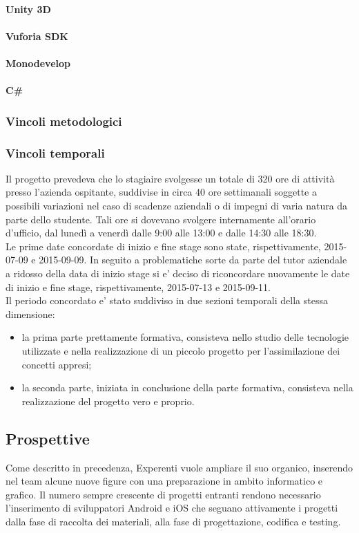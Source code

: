 \paragraph{Unity 3D}

\paragraph{Vuforia SDK}

\paragraph{Monodevelop}

\paragraph{C\#}

\subsubsection{Vincoli metodologici}

\subsubsection{Vincoli temporali}
Il progetto prevedeva che lo stagiaire svolgesse un totale di 320 ore di attività presso l’azienda ospitante, suddivise in circa 40 ore settimanali soggette a possibili variazioni nel caso di scadenze aziendali o di impegni di varia natura da parte dello studente. Tali ore si dovevano svolgere internamente all’orario d’ufficio, dal lunedì a venerdì dalle 9:00 alle 13:00 e dalle 14:30 alle 18:30.
\\
Le prime date concordate di inizio e fine stage sono state, rispettivamente, 2015-07-09 e 2015-09-09. In seguito a problematiche sorte da parte del tutor aziendale a ridosso della data di inizio stage si e' deciso di riconcordare nuovamente le date di inizio e fine stage, rispettivamente, 2015-07-13 e 2015-09-11. 
\\
Il periodo concordato e' stato suddiviso in due sezioni temporali della stessa dimensione:
\begin{itemize}
	\item la prima parte prettamente formativa, consisteva nello studio delle tecnologie utilizzate e nella realizzazione di un piccolo progetto per l'assimilazione dei concetti appresi;
	\item la seconda parte, iniziata in conclusione della parte formativa, consisteva nella realizzazione del progetto vero e proprio.
\end{itemize}

\subsection{Prospettive}
Come descritto in precedenza, Experenti vuole ampliare il suo organico, inserendo nel team alcune nuove figure con una preparazione in ambito informatico e grafico. Il numero sempre crescente di progetti entranti rendono necessario l'inserimento di sviluppatori Android e iOS che seguano attivamente i progetti dalla fase di raccolta dei materiali, alla fase di progettazione, codifica e testing.